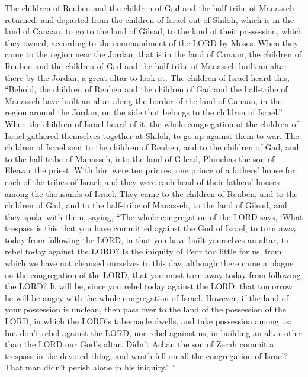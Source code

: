 \myverse{}The children of Reuben and the children of Gad and the half-tribe
of Manasseh returned, and departed from the children of Israel out of Shiloh, which is in the land of
Canaan, to go to the land of Gilead, to the land of their possession, which they owned, according to the
commandment of the LORD by Moses.
\myverse{}When they came to the region near the Jordan, that is in the land of Canaan,
the children of Reuben and the children of Gad and the half-tribe of Manasseh built an altar there by
the Jordan, a great altar to look at.
\myverse{}The children of Israel heard this, “Behold, the children of Reuben and the
children of Gad and the half-tribe of Manasseh have built an altar along the border of the land of Canaan,
in the region around the Jordan, on the side that belongs to the children of Israel.”
\myverse{}When the children of Israel heard of it, the whole congregation of the children
of Israel gathered themselves together at Shiloh, to go up against them to war.
\myverse{}The children of Israel sent to the children of Reuben, and to the children
of Gad, and to the half-tribe of Manasseh, into the land of Gilead, Phinehas the son of Eleazar the priest.
\myverse{}With him were ten princes, one prince of a fathers’ house for each of the
tribes of Israel; and they were each head of their fathers’ houses among the thousands of Israel.
\myverse{}They came to the children of Reuben, and to the children of Gad, and to the
half-tribe of Manasseh, to the land of Gilead, and they spoke with them, saying,
\myverse{}“The whole congregation of the LORD says, ‘What trespass is this that you
have committed against the God of Israel, to turn away today from following the LORD, in that you have
built yourselves an altar, to rebel today against the LORD?
\myverse{}Is the iniquity of Peor too little for us, from which we have not cleansed
ourselves to this day, although there came a plague on the congregation of the LORD,
\myverse{}that you must turn away today from following the LORD? It will be, since
you rebel today against the LORD, that tomorrow he will be angry with the whole congregation of Israel.
\myverse{}However, if the land of your possession is unclean, then pass over to the
land of the possession of the LORD, in which the LORD’s tabernacle dwells, and take possession among us;
but don’t rebel against the LORD, nor rebel against us, in building an altar other than the LORD our God’s
altar.
\myverse{}Didn’t Achan the son of Zerah commit a trespass in the devoted thing, and
wrath fell on all the congregation of Israel? That man didn’t perish alone in his iniquity.’ ”

